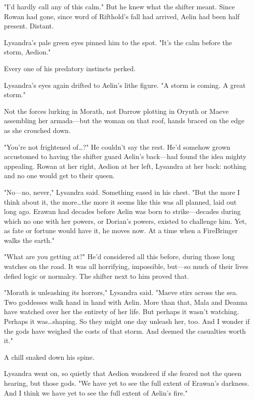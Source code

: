 "I'd hardly call any of this calm."
But he knew what the shifter meant.
Since Rowan had gone, since word of Rifthold's fall had arrived, Aelin had been half present.
Distant.

Lysandra's pale green eyes pinned him to the spot.
"It's the calm before the storm, Aedion."

Every one of his predatory instincts perked.

Lysandra's eyes again drifted to Aelin's lithe figure.
"A storm is coming.
A great storm."

Not the forces lurking in Morath, not Darrow plotting in Orynth or Maeve assembling her armada---but the woman on that roof, hands braced on the edge as she crouched down.

"You're not frightened of\ldots ?"
He couldn't say the rest.
He'd somehow grown accustomed to having the shifter guard Aelin's back---had found the idea mighty appealing.
Rowan at her right, Aedion at her left, Lysandra at her back: nothing and no one would get to their queen.

"No---no, never," Lysandra said.
Something eased in his chest.
"But the more I think about it, the more\ldots the more it seems like this was all planned, laid out long ago.
Erawan had decades before Aelin was born to strike---decades during which no one with her powers, or Dorian's powers, existed to challenge him.
Yet, as fate or fortune would have it, he moves now.
At a time when a FireBringer walks the earth."

"What are you getting at?"
He'd considered all this before, during those long watches on the road.
It was all horrifying, impossible, but---so much of their lives defied logic or normalcy.
The shifter next to him proved that.

"Morath is unleashing its horrors," Lysandra said.
"Maeve stirs across the sea.
Two goddesses walk hand in hand with Aelin.
More than that, Mala and Deanna have watched over her the entirety of her life.
But perhaps it wasn't watching.
Perhaps it was\ldots shaping.
So they might one day unleash her, too.
And I wonder if the gods have weighed the costs of that storm.
And deemed the casualties worth it."

A chill snaked down his spine.

Lysandra went on, so quietly that Aedion wondered if she feared not the queen hearing, but those gods.
"We have yet to see the full extent of Erawan's darkness.
And I think we have yet to see the full extent of Aelin's fire."


